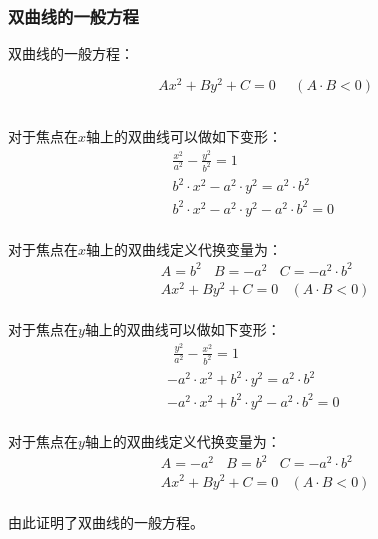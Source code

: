 \documentclass[UTF8]{ctexart}
\begin{document}
\subsubsection{双曲线的一般方程}
    \setcounter{equation}{0}
    双曲线的一般方程：
    \begin{large}
        \begin{equation*}
            ~~~~Ax^2+By^2+C=0~~~~~~(A\cdot B<0)
        \end{equation*}
    \end{large}\\
    对于焦点在$x$轴上的双曲线可以做如下变形：\vspace{3pt}
    \begin{align}
        &\frac{x^2}{a^2}-\frac{y^2}{b^2}=1\\[3mm]
        &b^2\cdot x^2-a^2\cdot y^2=a^2\cdot b^2\\[3mm]
        &b^2\cdot x^2-a^2\cdot y^2-a^2\cdot b^2=0~~~~~~~~
    \end{align}\\
    对于焦点在$x$轴上的双曲线定义代换变量为：\vspace{3pt}
    \begin{align}
        &A=b^2~~~~B=-a^2~~~~C=-a^2\cdot b^2\\[3mm]
        &Ax^2+By^2+C=0~~~~(A\cdot B<0)
    \end{align}\\
    对于焦点在$y$轴上的双曲线可以做如下变形：\vspace{3pt}
    \begin{align}
        &~~\frac{y^2}{a^2}-\frac{x^2}{b^2}=1\\[3mm]
        &-a^2\cdot x^2+b^2\cdot y^2=a^2\cdot b^2\\[3mm]
        &-a^2\cdot x^2+b^2\cdot y^2-a^2\cdot b^2=0~~~~~~~~
    \end{align}\\
    对于焦点在$y$轴上的双曲线定义代换变量为：\vspace{3pt}
    \begin{align}
        &A=-a^2~~~~B=b^2~~~~C=-a^2\cdot b^2\\[3mm]
        &Ax^2+By^2+C=0~~~~(A\cdot B<0)
    \end{align}\\
    由此证明了双曲线的一般方程。

\newpage
\end{document}
